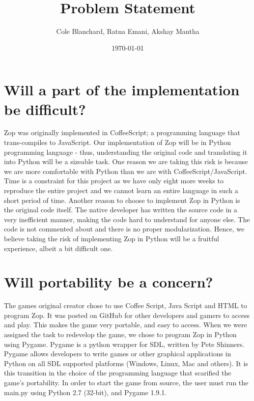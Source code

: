 \documentclass[12pt]{article}
\begin{document}
\title{Problem Statement}
\author{Cole Blanchard,
Ratna Emani, Akshay Mantha}
\date{\today}
\maketitle

\section{Will a part of the implementation be difficult?}
Zop was originally implemented in CoffeeScript; a programming language that trans-compiles to JavaScript. Our implementation of Zop will be in Python programming language - thus, understanding the original code and translating it into Python will be a sizeable task. One reason we are taking this risk is because we are more comfortable with Python than we are with CoffeeScript/JavaScript. Time is a constraint for this project as we have only eight more weeks to reproduce the entire project and we cannot learn an entire language in such a short period of time. Another reason to choose to implement Zop in Python is the original code itself. The native developer has written the source code in a very inefficient manner, making the code hard to understand for anyone else. The code is not commented about and there is no proper modularization. Hence, we believe taking the risk of implementing Zop in Python will be a fruitful experience, albeit a bit difficult one.
\section{Will portability be a concern?}
The games original creator chose to use Coffee Script, Java Script and HTML to program Zop. It was posted on GitHub for other developers and gamers to access and play. This makes the game very portable, and easy to access. When we were assigned the task to redevelop the game, we chose to program Zop in Python using Pygame. Pygame is a python wrapper for SDL, written by Pete Shinners. Pygame allows developers to write games or other graphical applications in Python on all SDL supported platforms (Windows, Linux, Mac and others). It is this transition in the choice of the programming language that scarified the game’s portability. In order to start the game from source, the user must run the main.py using Python 2.7 (32-bit), and Pygame 1.9.1.
\end{document}
